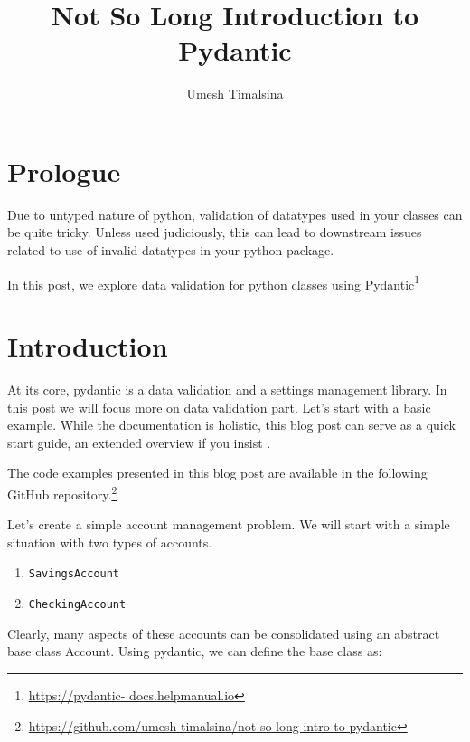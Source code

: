 \documentclass[12pt]{article}
\title{Not So Long Introduction to Pydantic}
\author{Umesh Timalsina}
\begin{document}
    \maketitle
    \section*{Prologue}

        Due to untyped nature of python, validation of datatypes used in your classes can be quite tricky. Unless used judiciously, this can lead to downstream issues related to use of invalid datatypes in your python package.

        In this post, we explore data validation for python classes using Pydantic\footnote{\url{https://pydantic-
        docs.helpmanual.io}}

    \section*{Introduction}
    At its core, pydantic is a data validation and a settings management library. In this post we will focus more on data validation part. Let's start with a basic example. While the documentation is holistic, this blog post can serve as a quick start guide, an extended overview if you insist \dSmiley.

The code examples presented in this blog post are available in the following GitHub repository.\footnote{\url{https://github.com/umesh-timalsina/not-so-long-intro-to-pydantic}}

Let's create a simple account management problem. We will start with a simple situation with two types of accounts.

    \begin{enumerate}
        \item \texttt{SavingsAccount}
        \item \texttt{CheckingAccount}
    \end{enumerate}

    Clearly, many aspects of these accounts can be consolidated using an abstract base class Account. Using pydantic, we can define the base class as:
\end{document}
